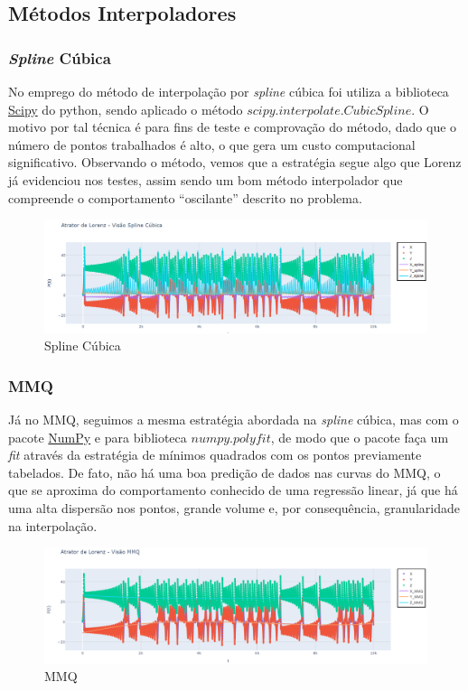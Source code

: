 \documentclass[12pt, a4paper]{article}
\begin{document}
    \subsection{Métodos Interpoladores}
    \subsubsection{\textit{Spline} Cúbica}
    
    No emprego do método de interpolação por \textit{spline} cúbica foi
    utiliza a biblioteca \href{https://docs.scipy.org/doc/scipy/index.html}{Scipy}
    do python, sendo aplicado o método $scipy.interpolate.CubicSpline$. O motivo
    por tal técnica é para fins de teste e comprovação do método, dado que o número
    de pontos trabalhados é alto, o que gera um custo computacional significativo.
    Observando o método, vemos que a estratégia segue algo que Lorenz já evidenciou
    nos testes, assim sendo um bom método interpolador que compreende o
    comportamento ``oscilante'' descrito no problema.
    
    \begin{figure}[H]
        \centering
        \includegraphics[width=\textwidth]{img/spline.png}
        \caption{Spline Cúbica}
        \label{fig:spline}
    \end{figure}
    
    \subsubsection{MMQ}
    Já no MMQ, seguimos a mesma estratégia abordada na \textit{spline}
    cúbica, mas com o pacote \href{https://numpy.org/doc/stable/index.html}{NumPy}
    e para biblioteca $numpy.polyfit$, de modo que o pacote faça um \textit{fit}
    através da estratégia de mínimos quadrados com os pontos previamente tabelados.
    De fato, não há uma boa predição de dados nas curvas do MMQ, o que se aproxima
    do comportamento conhecido de uma regressão linear, já que há uma alta
    dispersão nos pontos, grande volume e, por consequência, granularidade na
    interpolação.
    \begin{figure}[H]
        \centering
        \includegraphics[width=\textwidth]{img/mmq.png}
        \caption{MMQ}
        \label{fig:mmq}
    \end{figure}
    
\end{document}
